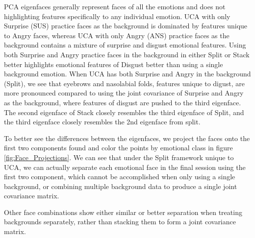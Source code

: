 \documentclass[12pt]{article}
\begin{document}
PCA eigenfaces generally represent faces of all the emotions and does not highlighting features specifically to any individual emotion.
UCA with only Surprise (SUS) practice faces as the background is dominated by features unique to Angry faces, whereas UCA with only Angry (ANS) practice faces as the background contains a mixture of surprise and disgust emotional features.
Using both Surprise and Angry practice faces in the background in either Split or Stack better highlights emotional features of Disgust better than using a single background emotion.
When UCA has both Surprise and Angry in the background (Split), we see that eyebrows and nasolabial folds, features unique to digust, are more pronounced compared to using the joint covariance of Surprise and Angry as the background, where features of disgust are pushed to the third eigenface. The second eigenface of Stack closely resembles the third eigenface of Split, and the third eigenface closely resembles the 2nd eigenface from split.

To better see the differences between the eigenfaces, we project the faces onto the first two components found and color the points by emotional class in figure \ref{fig:Face_Projections}.
We can see that under the Split framework unique to UCA, we can actually separate each emotional face in the final session using the first two component, which cannot be accomplished when only using a single background, or combining multiple background data to produce a single joint covariance matrix.

Other face combinations show either similar or better separation when treating backgrounds separately, rather than stacking them to form a joint covariance matrix.

\end{document}
